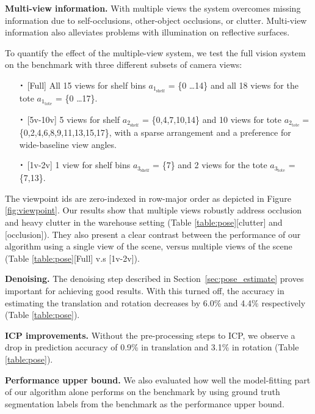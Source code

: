 \documentclass[letterpaper, 10 pt, conference]{ieeeconf}  %
\newcommand{\secref}[1]{Section~\ref{#1}}
\newcommand*{\Cdot}{\raisebox{-0.25ex}{\scalebox{1.75}{$\cdot$}}}
\newcommand{\myparagraph}[1]{\vspace{0.1in}\noindent\textbf{#1}}
\begin{document}
\myparagraph{Multi-view information.} With multiple views the system overcomes missing information due to self-occlusions,  other-object occlusions, or clutter. Multi-view information also alleviates problems with illumination on reflective surfaces. 

To quantify the effect of the multiple-view system, we test the full vision system on the benchmark with three different subsets of camera views: 
\begin{itemize}
\item[$\Cdot$] [Full] All 15 views for shelf bins $a_{1_\text{shelf}}$ = \{0 \ldots 14\} and all 18 views for the tote $a_{1_\text{tote}}$ = \{0 \ldots 17\}.
\item[$\Cdot$] [5v-10v] 5 views for shelf $a_{2_\text{shelf}}$ = \{0,4,7,10,14\} and 10 views for tote $a_{2_\text{tote}}=$\{0,2,4,6,8,9,11,13,15,17\}, with a sparse arrangement and a preference for wide-baseline view angles.
\item[$\Cdot$] [1v-2v] 1 view for shelf bins $a_{3_\text{shelf}}$ = \{7\} 
and 2 views for the tote $a_{3_\text{tote}}$ =\{7,13\}.
\end{itemize}
The viewpoint ids are zero-indexed in row-major order as depicted in Figure \ref{fig:viewpoint}.
Our results show that multiple views robustly address occlusion and heavy clutter in the warehouse setting (Table \ref{table:pose}[clutter] and [occlusion]).
They also present a clear contrast between the performance of our algorithm using a single view of the scene, versus multiple views of the scene (Table \ref{table:pose}[Full] v.s [1v-2v]). 



\myparagraph{Denoising.} The denoising step described in \secref{sec:pose_estimate} proves important for achieving good results. With this turned off, the accuracy in estimating the translation and rotation decreases by 6.0\% and 4.4\% respectively (Table \ref{table:pose}). 


\myparagraph{ICP improvements.} Without the pre-processing steps to ICP, we observe a drop in prediction accuracy of 0.9\% in translation and 3.1\% in rotation (Table \ref{table:pose}).


\myparagraph{Performance upper bound.} We also evaluated how well the model-fitting part of our algorithm alone performs on the benchmark by using ground truth segmentation labels from the benchmark as the performance upper bound.
\end{document}
